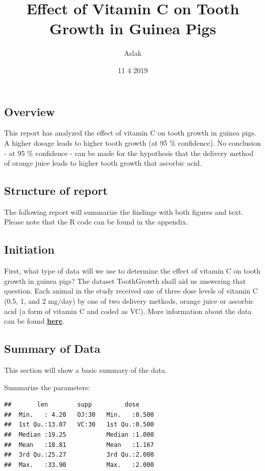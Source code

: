 \documentclass[]{article}
\title{Effect of Vitamin C on Tooth Growth in Guinea Pigs}
\author{Aslak}
\date{11 4 2019}
\begin{document}
\maketitle

\subsection{Overview}\label{overview}

This report has analyzed the effect of vitamin C on tooth growth in
guinea pigs. A higher dosage leads to higher tooth growth (at 95 \%
confidence). No conclusion - at 95 \% confidence - can be made for the
hypothesis that the delivery method of orange juice leads to higher
tooth growth that ascorbic acid.

\subsection{Structure of report}\label{structure-of-report}

The following report will summarize the findings with both figures and
text. Please note that the R code can be found in the appendix.

\subsection{Initiation}\label{initiation}

First, what type of data will we use to determine the effect of vitamin
C on tooth growth in guinea pigs? The dataset ToothGrowth shall aid us
answering that question. Each animal in the study received one of three
dose levels of vitamin C (0.5, 1, and 2 mg/day) by one of two delivery
methods, orange juice or ascorbic acid (a form of vitamin C and coded as
VC). More information about the data can be found
\textbf{\href{https://stat.ethz.ch/R-manual/R-devel/library/datasets/html/ToothGrowth.html}{here}}.

\subsection{Summary of Data}\label{summary-of-data}

This section will show a basic summary of the data.

Summarize the parameters:

\begin{verbatim}
##       len        supp         dose      
##  Min.   : 4.20   OJ:30   Min.   :0.500  
##  1st Qu.:13.07   VC:30   1st Qu.:0.500  
##  Median :19.25           Median :1.000  
##  Mean   :18.81           Mean   :1.167  
##  3rd Qu.:25.27           3rd Qu.:2.000  
##  Max.   :33.90           Max.   :2.000
\end{verbatim}
\end{document}
